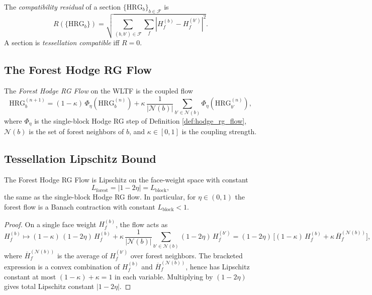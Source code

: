 \begin{definition}
\label{def:compat_residual}
The \emph{compatibility residual} of a section
$\{\mathrm{HRG}_{b}\}_{b\in\mathcal{F}}$ is
\[
R(\{\mathrm{HRG}_{b}\})=\sqrt{\sum_{(b,b')\in\mathcal{F}}\sum_{f}
  |H_{f}^{(b)}-H_{f}^{(b')}|^{2}}.
\]
A section is \emph{tessellation compatible} iff $R=0$.
\end{definition}

\subsection{The Forest Hodge RG Flow}
\label{ssec:forest_flow}

\begin{definition}
\label{def:forest_flow}
The \emph{Forest Hodge RG Flow} on the WLTF is the coupled flow
\[
\mathrm{HRG}_{b}^{(n+1)}=(1-\kappa)\,\Phi_{\eta}(\mathrm{HRG}_{b}^{(n)})
+\kappa\,\frac{1}{|\mathcal{N}(b)|}\sum_{b'\in\mathcal{N}(b)}
  \Phi_{\eta}(\mathrm{HRG}_{b'}^{(n)}),
\]
where $\Phi_{\eta}$ is the single-block Hodge RG step of
Definition \ref{def:hodge_rg_flow}, $\mathcal{N}(b)$ is the set of
forest neighbors of $b$, and $\kappa\in[0,1]$ is the coupling strength.
\end{definition}

\subsection{Tessellation Lipschitz Bound}
\label{ssec:tlb}

\begin{theorem}
\label{thm:tlb}
The Forest Hodge RG Flow is Lipschitz on the face-weight space with
constant
\[
L_{\mathrm{forest}}=|1-2\eta|=L_{\mathrm{block}},
\]
the same as the single-block Hodge RG flow. In particular, for
$\eta\in(0,1)$ the forest flow is a Banach contraction with constant
$L_{\mathrm{block}}<1$.
\end{theorem}

\begin{proof}
On a single face weight $H_{f}^{(b)}$, the flow acts as
\[
H_{f}^{(b)}\mapsto(1-\kappa)\,(1-2\eta)\,H_{f}^{(b)}
+\kappa\,\frac{1}{|\mathcal{N}(b)|}\sum_{b'\in\mathcal{N}(b)}
  (1-2\eta)\,H_{f}^{(b')}
=(1-2\eta)\,\Big[(1-\kappa)\,H_{f}^{(b)}
+\kappa\,\overline{H}_{f}^{(\mathcal{N}(b))}\Big],
\]
where $\overline{H}_{f}^{(\mathcal{N}(b))}$ is the average of
$H_{f}^{(b')}$ over forest neighbors. The bracketed expression is a
convex combination of $H_{f}^{(b)}$ and
$\overline{H}_{f}^{(\mathcal{N}(b))}$, hence has Lipschitz constant at
most $(1-\kappa)+\kappa=1$ in each variable. Multiplying by
$(1-2\eta)$ gives total Lipschitz constant $|1-2\eta|$.
\end{proof}

